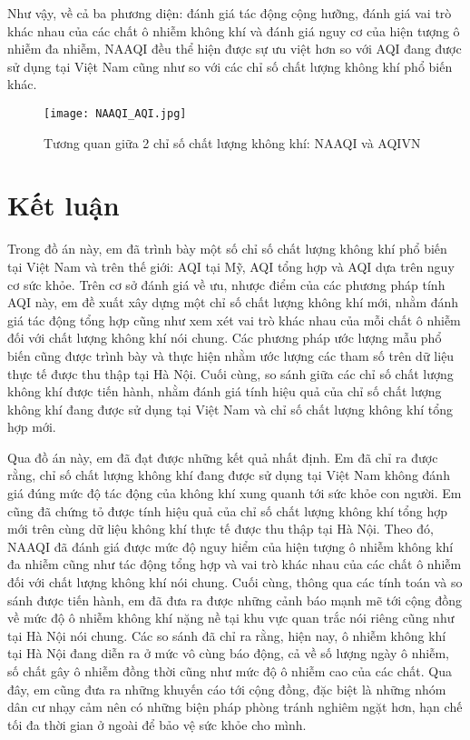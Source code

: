 \documentclass[14pt]{extreport}
\theoremstyle{definition}
\theoremstyle{plain}
\theoremstyle{remark}
\begin{document}
Như vậy, về cả ba phương diện: đánh giá tác động cộng hưỡng, đánh giá vai trò khác nhau của các chất ô nhiễm không khí và đánh giá nguy cơ của hiện tượng ô nhiễm đa nhiễm, NAAQI đều thể hiện được sự ưu việt hơn so với AQI đang được sử dụng tại Việt Nam cũng như so với các chỉ số chất lượng không khí phổ biến khác.

\begin{figure}
\begin{center}
\texttt{[image: NAAQI\_AQI.jpg]}
\end{center}
\caption{Tương quan giữa 2 chỉ số chất lượng không khí: NAAQI và AQIVN}
\end{figure}

\chapter{Kết luận}
Trong đồ án này, em đã trình bày một số chỉ số chất lượng không khí phổ biến tại Việt Nam và trên thế giới: AQI tại Mỹ, AQI tổng hợp và AQI dựa trên nguy cơ sức khỏe. Trên cơ sở đánh giá về ưu, nhược điểm của các phương pháp tính AQI này, em đề xuất xây dựng một chỉ số chất lượng không khí mới, nhằm đánh giá tác động tổng hợp cũng như xem xét vai trò khác nhau của mỗi chất ô nhiễm đối với chất lượng không khí nói chung. Các phương pháp ước lượng mẫu phổ biến cũng được trình bày và thực hiện nhằm ước lượng các tham số trên dữ liệu thực tế được thu thập tại Hà Nội. Cuối cùng, so sánh giữa các chỉ số chất lượng không khí được tiến hành, nhằm đánh giá tính hiệu quả của chỉ số chất lượng không khí đang được sử dụng tại Việt Nam và chỉ số chất lượng không khí tổng hợp mới.

Qua đồ án này, em đã đạt được những kết quả nhất định. Em đã chỉ ra được rằng, chỉ số chất lượng không khí đang được sử dụng tại Việt Nam không đánh giá đúng mức độ tác động của không khí xung quanh tới sức khỏe con người. Em cũng đã chứng tỏ được tính hiệu quả của chỉ số chất lượng không khí tổng hợp mới trên cùng dữ liệu không khí thực tế được thu thập tại Hà Nội. Theo đó, NAAQI đã đánh giá được mức độ nguy hiểm của hiện tượng ô nhiễm không khí đa nhiễm cũng như tác động tổng hợp và vai trò khác nhau của các chất ô nhiễm đối với chất lượng không khí nói chung. Cuối cùng, thông qua các tính toán và so sánh được tiến hành, em đã đưa ra được những cảnh báo mạnh mẽ tới cộng đồng về mức độ ô nhiễm không khí nặng nề tại khu vực quan trắc nói riêng cũng như tại Hà Nội nói chung. Các so sánh đã chỉ ra rằng, hiện nay, ô nhiễm không khí tại Hà Nội đang diễn ra ở mức vô cùng báo động, cả về số lượng ngày ô nhiễm, số chất gây ô nhiễm đồng thời cũng như mức độ ô nhiễm cao của các chất. Qua đây, em cũng đưa ra những khuyến cáo tới cộng đồng, đặc biệt là những nhóm dân cư nhạy cảm nên có những biện pháp phòng tránh nghiêm ngặt hơn, hạn chế tối đa thời gian ở ngoài để bảo vệ sức khỏe cho mình.
\end{document}
